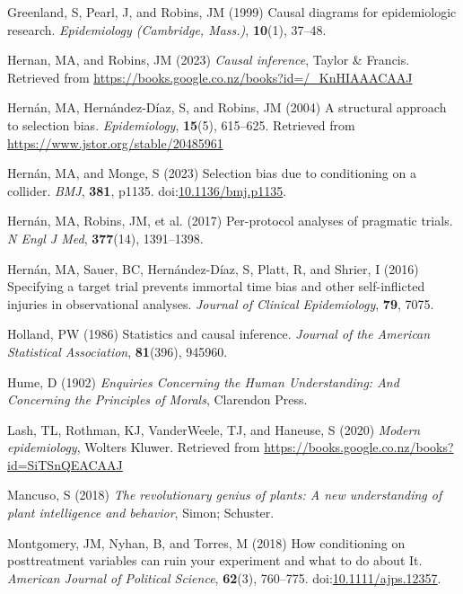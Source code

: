 \documentclass[
  singlecolumn]{article}
\newlength{\cslhangindent}
\newenvironment{CSLReferences}[2] %
 {\begin{list}{}{%
  \setlength{\itemindent}{0pt}
  \setlength{\leftmargin}{0pt}
  \setlength{\parsep}{0pt}
  \ifodd #1
   \setlength{\leftmargin}{\cslhangindent}
   \setlength{\itemindent}{-1\cslhangindent}
  \fi
  \setlength{\itemsep}{#2\baselineskip}}}
 {\end{list}}
\begin{document}
\begin{CSLReferences}{1}{0}
Greenland, S, Pearl, J, and Robins, JM (1999) Causal diagrams for
epidemiologic research. \emph{Epidemiology (Cambridge, Mass.)},
\textbf{10}(1), 37--48.

Hernan, MA, and Robins, JM (2023) \emph{Causal inference}, Taylor \&
Francis. Retrieved from
\url{https://books.google.co.nz/books?id=/_KnHIAAACAAJ}

Hernán, MA, Hernández-Díaz, S, and Robins, JM (2004) A structural
approach to selection bias. \emph{Epidemiology}, \textbf{15}(5),
615--625. Retrieved from \url{https://www.jstor.org/stable/20485961}

Hernán, MA, and Monge, S (2023) Selection bias due to conditioning on a
collider. \emph{BMJ}, \textbf{381}, p1135.
doi:\href{https://doi.org/10.1136/bmj.p1135}{10.1136/bmj.p1135}.

Hernán, MA, Robins, JM, et al. (2017) Per-protocol analyses of pragmatic
trials. \emph{N Engl J Med}, \textbf{377}(14), 1391--1398.

Hernán, MA, Sauer, BC, Hernández-Díaz, S, Platt, R, and Shrier, I (2016)
Specifying a target trial prevents immortal time bias and other
self-inflicted injuries in observational analyses. \emph{Journal of
Clinical Epidemiology}, \textbf{79}, 7075.

Holland, PW (1986) Statistics and causal inference. \emph{Journal of the
American Statistical Association}, \textbf{81}(396), 945960.

Hume, D (1902) \emph{Enquiries Concerning the Human Understanding: And
Concerning the Principles of Morals}, Clarendon Press.

Lash, TL, Rothman, KJ, VanderWeele, TJ, and Haneuse, S (2020)
\emph{Modern epidemiology}, Wolters Kluwer. Retrieved from
\url{https://books.google.co.nz/books?id=SiTSnQEACAAJ}

Mancuso, S (2018) \emph{The revolutionary genius of plants: A new
understanding of plant intelligence and behavior}, Simon; Schuster.

Montgomery, JM, Nyhan, B, and Torres, M (2018) How conditioning on
posttreatment variables can ruin your experiment and what to do about
It. \emph{American Journal of Political Science}, \textbf{62}(3),
760--775.
doi:\href{https://doi.org/10.1111/ajps.12357}{10.1111/ajps.12357}.


\end{CSLReferences}
\end{document}
